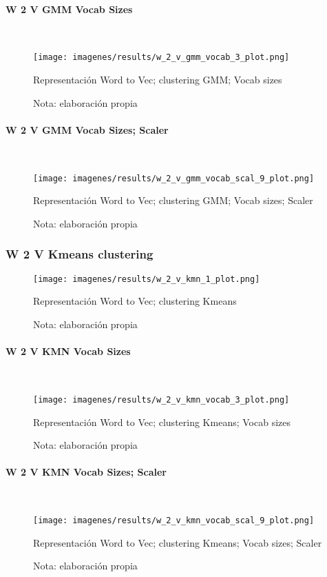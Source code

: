\documentclass[12pt]{article}
\newcommand{\subsubsubsection}[1]{\paragraph{#1}\mbox{}\\}
\begin{document}
				\subsubsubsection{W 2 V GMM Vocab Sizes}				
				\begin{figure}[H]
					\texttt{[image: imagenes/results/w\_2\_v\_gmm\_vocab\_3\_plot.png]}
					\centering
					\caption{Representación Word to Vec; clustering GMM; Vocab sizes}
					\caption*{\small Nota:  elaboración propia}
					\label{fig:w2v_gmm_vocab_3}
				\end{figure}
							
				\subsubsubsection{W 2 V GMM Vocab Sizes; Scaler}				
				\begin{figure}[H]
					\texttt{[image: imagenes/results/w\_2\_v\_gmm\_vocab\_scal\_9\_plot.png]}
					\centering
					\caption{Representación Word to Vec; clustering GMM; Vocab sizes; Scaler}
					\caption*{\small Nota:  elaboración propia}
					\label{fig:w2v_gmm_vocab_scal_9}
				\end{figure}
				
			\subsubsection{W 2 V Kmeans clustering}									
			\begin{figure}[H]
				\texttt{[image: imagenes/results/w\_2\_v\_kmn\_1\_plot.png]}
				\centering
				\caption{Representación Word to Vec; clustering Kmeans}
				\caption*{\small Nota:  elaboración propia}
				\label{fig:w2v_kmn_1}
			\end{figure}
			
				\subsubsubsection{W 2 V KMN Vocab Sizes}				
				\begin{figure}[H]
					\texttt{[image: imagenes/results/w\_2\_v\_kmn\_vocab\_3\_plot.png]}
					\centering
					\caption{Representación Word to Vec; clustering Kmeans; Vocab sizes}
					\caption*{\small Nota:  elaboración propia}
					\label{fig:w2v_kmn_vocab_3}
				\end{figure}
							
				\subsubsubsection{W 2 V KMN Vocab Sizes; Scaler}				
				\begin{figure}[H]
					\texttt{[image: imagenes/results/w\_2\_v\_kmn\_vocab\_scal\_9\_plot.png]}
					\centering
					\caption{Representación Word to Vec; clustering Kmeans; Vocab sizes; Scaler}
					\caption*{\small Nota:  elaboración propia}
					\label{fig:w2v_kmn_vocab_scal_9}
				\end{figure}
	
\end{document}
